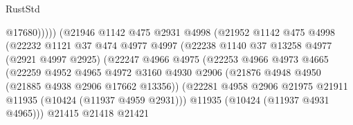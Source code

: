 \begin{lexlean}{RustStd}
\begin{coremodule}
                                          @17680)))))
                                (@21946
                                  @1142
                                  @475
                                  @2931
                                  @4998
                                  (@21952
                                    @1142
                                    @475
                                    @4998
                                    (@22232
                                      @1121
                                      @37
                                      @474
                                      @4977
                                      @4997
                                      (@22238
                                        @1140
                                        @37
                                        @13258
                                        @4977
                                        (@2921 @4997 @2925)
                                        (@22247
                                          @4966
                                          @4975
                                          (@22253
                                            @4966
                                            @4973
                                            @4665
                                            (@22259
                                              @4952
                                              @4965
                                              @4972
                                              @3160
                                              @4930
                                              @2906
                                              (@21876
                                                @4948
                                                @4950
                                                (@21885 @4938 @2906 @17662 @13356))
                                              (@22281
                                                @4958
                                                @2906
                                                @21975
                                                @21911
                                                @11935
                                                (@10424 (@11937 @4959 @2931)))
                                              @11935
                                              (@10424 (@11937 @4931 @4965)))
                                            @21415
                                            @21418
                                            @21421

\end{coremodule}
\end{lexlean}
